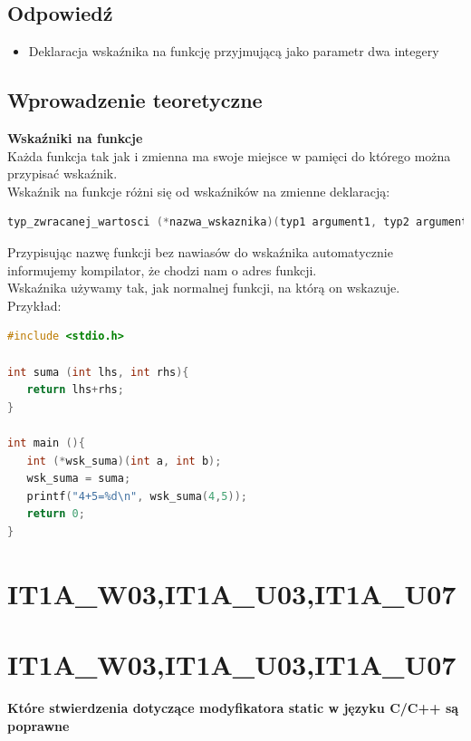 \subsection{Odpowiedź}
\begin{itemize}
\item Deklaracja wskaźnika na funkcję przyjmującą jako parametr dwa integery\\
\end{itemize}

\subsection{Wprowadzenie teoretyczne}
\textbf{Wskaźniki na funkcje}\\
Każda funkcja tak jak i zmienna ma swoje miejsce w pamięci do którego można przypisać wskaźnik.\\
Wskaźnik na funkcje różni się od wskaźników na zmienne deklaracją:
\begin{lstlisting}[language=c]
typ_zwracanej_wartosci (*nazwa_wskaznika)(typ1 argument1, typ2 argument2, ...);
\end{lstlisting}
Przypisując nazwę funkcji bez nawiasów do wskaźnika automatycznie informujemy kompilator, że chodzi nam o adres funkcji.\\
Wskaźnika używamy tak, jak normalnej funkcji, na którą on wskazuje.\\
Przykład:
\begin{lstlisting}[language=c]
#include <stdio.h>

int suma (int lhs, int rhs){
   return lhs+rhs;
}
 
int main (){
   int (*wsk_suma)(int a, int b);
   wsk_suma = suma;
   printf("4+5=%d\n", wsk_suma(4,5));
   return 0;
}
\end{lstlisting}

\section{IT1A\_W03,IT1A\_U03,IT1A\_U07} 
\section{IT1A\_W03,IT1A\_U03,IT1A\_U07} 
\textbf{Które stwierdzenia dotyczące modyfikatora static w języku C/C++ są poprawne}


